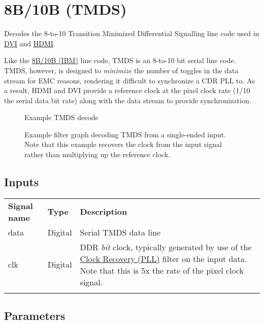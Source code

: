\pagebreak
\section{8B/10B (TMDS)}
\label{filter:tmds}

Decodes the 8-to-10 Transition Minimized Differential Signalling line code used in \hyperref[filter:dvi]{DVI} and
\hyperref[filter:hdmi]{HDMI}.

Like the \hyperref[filter:8b10b]{8B/10B (IBM)} line code, TMDS is an 8-to-10 bit serial line code. TMDS, however, is
designed to \emph{minimize} the number of toggles in the data stream for EMC reasons, rendering it difficult to
synchronize a CDR PLL to. As a result, HDMI and DVI provide a reference clock at the pixel clock rate (1/10 the serial
data bit rate) along with the data stream to provide synchronization.

\begin{figure}[h]
\centering
{}
\caption{Example TMDS decode}
\label{filter_tmds}
\end{figure}

\begin{figure}[h]
\centering
{}
\caption{Example filter graph decoding TMDS from a single-ended input. Note that this example recovers the clock from
the input signal rather than multiplying up the reference clock.}
\label{filter_graph_tmds}
\end{figure}

\subsection{Inputs}

\begin{tabularx}{16cm}{llX}
\thickhline
\textbf{Signal name} & \textbf{Type} & \textbf{Description} \\
\thickhline
data & Digital & Serial TMDS data line \\
\thinhline
clk & Digital & DDR \emph{bit} clock, typically generated by use of the \hyperref[filter:cdrpll]{Clock Recovery
(PLL)} filter on the input data. Note that this is 5x the rate of the pixel clock signal. \\
\thickhline
\end{tabularx}

\subsection{Parameters}

